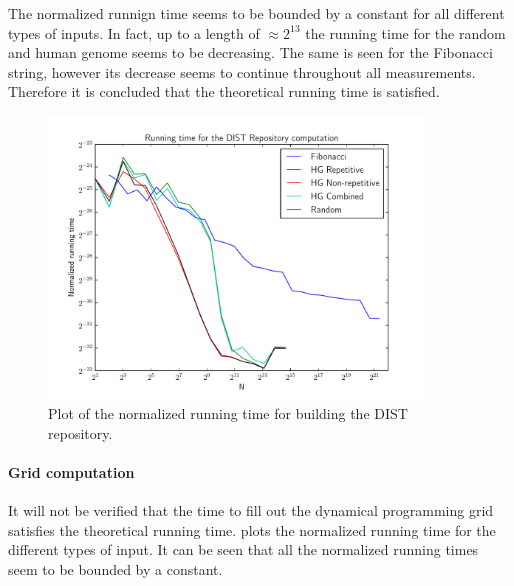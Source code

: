 \documentclass[twoside,11pt,openright]{report}
\begin{document}
The normalized runnign time seems to be bounded by a constant for all different types of inputs. In fact, up to a length of $\approx 2^{13}$ the running time for the random and human genome seems to be decreasing. The same is seen for the Fibonacci string, however its decrease seems to continue throughout all measurements.
Therefore it is concluded that the theoretical running time is satisfied.

\begin{figure}[!htb]
  \centering
  \includegraphics[width=10cm]{combined/dist_runningtime}
  \caption{Plot of the normalized running time for building the DIST repository.}
  \label{fig:benchmark:dist-repo-time}
\end{figure}


\paragraph{Grid computation}
It will not be verified that the time to fill out the dynamical programming grid satisfies the theoretical running time.  plots the normalized running time for the different types of input. It can be seen that all the normalized running times seem to be bounded by a constant.
\end{document}
